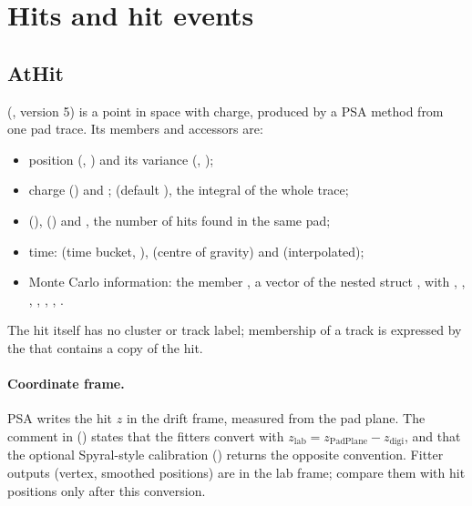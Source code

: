 \section{Hits and hit events}
\label{sec:dm-hits}

\subsection{AtHit}

 (, version 5) is a point in space with charge, produced by a PSA method from
one pad trace. Its members and accessors are:

\begin{itemize}
\item position  (, ) and its variance
   (, );
\item charge  () and ;
   (default ), the integral of the whole trace;
\item {} (),  () and , the
  number of hits found in the same pad;
\item time:  (time bucket, ),  (centre of gravity)
  and  (interpolated);
\item Monte Carlo information: the member , a vector of the nested
  struct , with , , , ,
  , , .
\end{itemize}

The hit itself has no cluster or track label; membership of a track is expressed by the
 that contains a copy of the hit.

\paragraph{Coordinate frame.} PSA writes the hit $z$ in the drift frame, measured from the pad plane.
The comment in  () states that the fitters convert with
$z_\mathrm{lab} = z_\mathrm{PadPlane} - z_\mathrm{digi}$, and that the optional Spyral-style calibration
() returns the opposite convention. Fitter outputs (vertex, smoothed positions) are
in the lab frame; compare them with hit positions only after this conversion.

